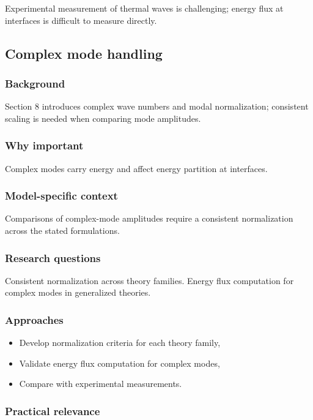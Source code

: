 Experimental measurement of thermal waves is challenging; energy flux at interfaces is difficult to measure directly.

\subsection{Complex mode handling}
\label{sec:15.5}

\subsubsection{Background}

Section 8 introduces complex wave numbers and modal normalization; consistent scaling is needed when comparing mode amplitudes.

\subsubsection{Why important}

Complex modes carry energy and affect energy partition at interfaces.

\subsubsection{Model-specific context}

Comparisons of complex-mode amplitudes require a consistent normalization across the stated formulations.

\subsubsection{Research questions}

Consistent normalization across theory families. Energy flux computation for complex modes in generalized theories.

\subsubsection{Approaches}

\begin{itemize}
\item Develop normalization criteria for each theory family,
\item Validate energy flux computation for complex modes,
\item Compare with experimental measurements.
\end{itemize}

\subsubsection{Practical relevance}

